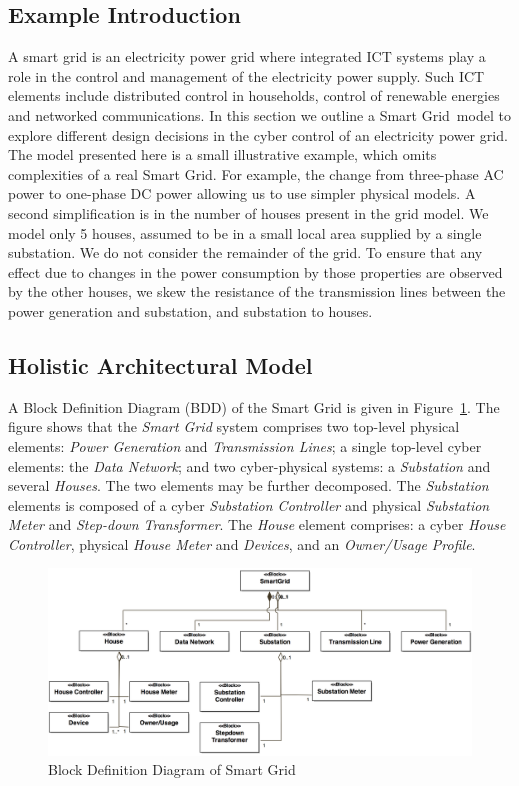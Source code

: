 \subsection*{Example Introduction}

A smart grid is an electricity power grid where integrated ICT systems play a role in the control and management of the electricity power supply. Such ICT elements include distributed control in households, control of renewable energies and networked communications.
In this section we outline a Smart Grid\ model to explore different design decisions in the cyber control of an electricity power grid. The model presented here is a small illustrative example, which omits complexities of a real Smart Grid. For example, the change from three-phase AC power to one-phase DC power allowing us to use simpler physical models. A second simplification is in the number of houses present in the grid model. We model only 5 houses, assumed to be in a small local area supplied by a single substation. We do not consider the remainder of the grid. To ensure that any effect due to changes in the power consumption by those properties are observed by the other houses, we skew the resistance of the transmission lines between the power generation and substation, and substation to houses.

\subsection*{Holistic Architectural Model}

A Block Definition Diagram (BDD) of the Smart Grid is given in Figure~\ref{fig:bdd}. The figure shows that the \textit{Smart Grid} system comprises two top-level physical elements: \textit{Power Generation} and \textit{Transmission Lines}; a single top-level cyber elements: the \textit{Data Network}; and two cyber-physical systems: a \textit{Substation} and several \textit{Houses}. The two elements may be further decomposed. The \textit{Substation} elements is composed of a cyber \textit{Substation Controller} and physical \textit{Substation Meter} and \textit{Step-down Transformer}. The \textit{House} element comprises: a cyber \textit{House Controller}, physical \textit{House Meter} and \textit{Devices}, and an \textit{Owner/Usage Profile}.

\begin{figure}
\centering
\includegraphics[width=1\textwidth]{figures/BDDSmartGrid}
\caption{Block Definition Diagram of Smart Grid}
\label{fig:bdd}
\end{figure}

